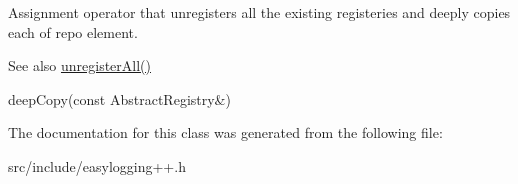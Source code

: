 Assignment operator that unregisters all the existing registeries and deeply copies each of repo element. 

\begin{DoxySeeAlso}{See also}
\hyperlink{classel_1_1base_1_1utils_1_1_registry_ac40e62ddf5017beb91c28b472c9628c2}{unregister\+All()} 

deep\+Copy(const Abstract\+Registry\&) 
\end{DoxySeeAlso}


The documentation for this class was generated from the following file\+:\begin{DoxyCompactItemize}
\item 
src/include/easylogging++.\+h\end{DoxyCompactItemize}
